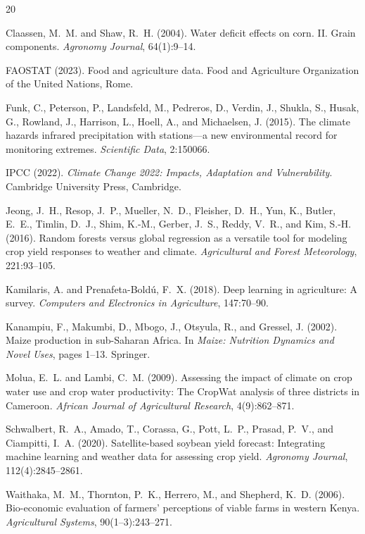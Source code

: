 \documentclass[11pt,a4paper]{article}
\begin{document}
\begin{thebibliography}{20}

Claassen, M.~M. and Shaw, R.~H. (2004).
\newblock Water deficit effects on corn. II. Grain components.
\newblock \emph{Agronomy Journal}, 64(1):9--14.

FAOSTAT (2023).
\newblock Food and agriculture data.
\newblock Food and Agriculture Organization of the United Nations, Rome.

Funk, C., Peterson, P., Landsfeld, M., Pedreros, D., Verdin, J., Shukla, S., Husak, G., Rowland, J., Harrison, L., Hoell, A., and Michaelsen, J. (2015).
\newblock The climate hazards infrared precipitation with stations---a new environmental record for monitoring extremes.
\newblock \emph{Scientific Data}, 2:150066.

IPCC (2022).
\newblock \emph{Climate Change 2022: Impacts, Adaptation and Vulnerability}.
\newblock Cambridge University Press, Cambridge.

Jeong, J.~H., Resop, J.~P., Mueller, N.~D., Fleisher, D.~H., Yun, K., Butler, E.~E., Timlin, D.~J., Shim, K.-M., Gerber, J.~S., Reddy, V.~R., and Kim, S.-H. (2016).
\newblock Random forests versus global regression as a versatile tool for modeling crop yield responses to weather and climate.
\newblock \emph{Agricultural and Forest Meteorology}, 221:93--105.

Kamilaris, A. and Prenafeta-Bold\'{u}, F.~X. (2018).
\newblock Deep learning in agriculture: A survey.
\newblock \emph{Computers and Electronics in Agriculture}, 147:70--90.

Kanampiu, F., Makumbi, D., Mbogo, J., Otsyula, R., and Gressel, J. (2002).
\newblock Maize production in sub-Saharan Africa.
\newblock In \emph{Maize: Nutrition Dynamics and Novel Uses}, pages 1--13. Springer.

Molua, E.~L. and Lambi, C.~M. (2009).
\newblock Assessing the impact of climate on crop water use and crop water productivity: The CropWat analysis of three districts in Cameroon.
\newblock \emph{African Journal of Agricultural Research}, 4(9):862--871.

Schwalbert, R.~A., Amado, T., Corassa, G., Pott, L.~P., Prasad, P.~V., and Ciampitti, I.~A. (2020).
\newblock Satellite-based soybean yield forecast: Integrating machine learning and weather data for assessing crop yield.
\newblock \emph{Agronomy Journal}, 112(4):2845--2861.

Waithaka, M.~M., Thornton, P.~K., Herrero, M., and Shepherd, K.~D. (2006).
\newblock Bio-economic evaluation of farmers' perceptions of viable farms in western Kenya.
\newblock \emph{Agricultural Systems}, 90(1--3):243--271.

\end{thebibliography}
\end{document}
